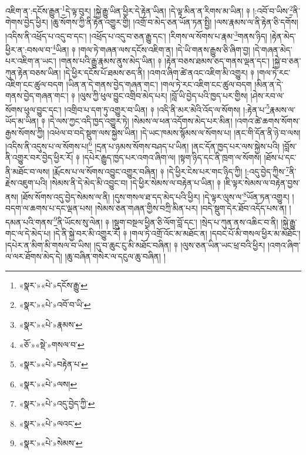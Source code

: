 འཇིག་ན་:དངོས་རྒྱུན་\footnote{«སྣར་»«པེ་»དངོས་རྒྱུ་}དེ་ལྟ་བུར། །སྐྱེ་རྒྱུ་ཡིན་ཕྱིར་དེ་རྟེན་ཡིན། །དེ་ལྟ་མིན་ན་རིགས་མ་ཡིན། ༈ །:འབོ་བ་ཡིས་\footnote{«སྣར་»«པེ་»འབོ་བ་ཡི་}ནི་གེགས་བྱེད་ཕྱིར། །ཆུ་སོགས་ཀྱི་ནི་རྟེན་འགྱུར་གྱི། །འགྲོ་བ་མེད་ཅན་ཡོན་ཏན་སྤྱི། །ལས་རྣམས་ལ་ནི་རྟེན་ཅི་དགོས། །འདིས་ནི་འཕྲོད་པ་འདུ་བ་དང་། །འཕྲོད་པ་འདུ་བ་ཅན་རྒྱུ་དང་། །རིགས་ལ་སོགས་པ་རྣམ་\footnote{«སྣར་»«པེ་»རྣམས་}གནས་ཉིད། །རྟེན་མེད་ཕྱིར་ན་:བསལ་བ་\footnote{«ཅོ་»«སྡེ་»གསལ་བ་}ཡིན། ༈ །གལ་ཏེ་གཞན་ལས་དངོས་འཇིག་ན། །དེ་ཡི་གནས་རྒྱུས་ཅི་ཞིག་བྱ། །དེ་གཞན་མེད་པར་འཇིག་ན་ཡང་། །གནས་པའི་རྒྱུ་རྣམས་ནུས་མེད་ཡིན། ༈ །རྟེན་བཅས་ཐམས་ཅད་གནས་ལྡན་དང་། །སྐྱེ་བ་ཅན་ཀུན་རྟེན་བཅས་ཡིན། །དེ་ཕྱིར་དངོས་པོ་ཐམས་ཅད་ནི། །འགའ་ཞིག་ཚེ་ནའང་འཇིག་མི་འགྱུར། ༈ །གལ་ཏེ་རང་འཇིག་ངང་ཚུལ་བདག །ཡིན་ན་དེ་གནས་བྱེད་གཞན་གང་། །གལ་ཏེ་རང་འཇིག་ངང་ཚུལ་བདག །མིན་ན་དེ་གནས་བྱེད་གཞན་གང་། ༈ །ལུས་ཀྱི་ཕུལ་བྱུང་འགྲིབ་མེད་པར། །བློ་ཡི་བྱེད་པའི་ཁྱད་པར་གྱིས། །ཤེས་རབ་ལ་སོགས་ཕུལ་བྱུང་དང་། །འགྲིབ་པ་དག་ཏུ་འགྱུར་བ་ཡིན། ༈ །འདི་ནི་མར་མེའི་འོད་ལ་སོགས། །:རྟེན་པ་\footnote{«སྣར་»«པེ་»བརྟེན་པ་}རྣམས་ལ་ཡོད་མ་ཡིན། ༈ །དེ་ལས་ཀྱང་འདི་ཁྱད་འགྱུར་ཏེ། །སེམས་ལ་ཕན་འདོགས་མེད་པར་མིན། །འགའ་ཚེ་ཆགས་སོགས་རྒྱས་སོགས་ཀྱི། །འཕེལ་བ་བདེ་སྡུག་ལས་སྐྱེས་ཡིན། །དེ་ཡང་ཁམས་སྙོམས་ལ་སོགས་པ། །ནང་གི་དོན་ནི་ཉེ་བ་ལས། །འདིས་ནི་འདུས་པ་ལ་སོགས་པ།\footnote{«སྣར་»«པེ་»ལས།} །དྲན་པ་ཉམས་སོགས་བཤད་པ་ཡིན། །ནང་དོན་ཁྱད་པར་ལས་སྐྱེས་པའི། །བློས་ནི་འགྱུར་བར་བྱེད་ཕྱིར་རོ། ༈ །དཔེར་རྒྱུད་ཁྱད་པར་འགའ་ཞིག་ལ། །སྟག་ཉིད་དང་ནི་ཁྲག་ལ་སོགས། །ཐོས་པ་དང་ནི་མཐོང་བ་ལས། །རྨོངས་པ་ལ་སོགས་འབྱུང་འགྱུར་བཞིན། ༈ །དེ་ཕྱིར་ངེས་པར་གང་ཉིད་ཀྱི། །:འདུ་བྱེད་ཀྱིས་\footnote{«སྣར་»«པེ་»འདུ་བྱེད་ཀྱི་}ནི་རྗེས་འཇུག་པའི། །སེམས་ནི་དེ་མེད་མི་འབྱུང་བ། །དེ་ཕྱིར་སེམས་ལ་བརྟེན་པ་ཡིན། ༈ །ཇི་ལྟར་སེམས་ལ་བརྟེན་བྱས་ནས། །ཐོས་སོགས་འདུ་བྱེད་སེམས་ལ་ནི། །དུས་གསལ་ཐ་དད་མེད་པའི་ཕྱིར། །དེ་ལྟར་ལུས་ལ་\footnote{«སྣར་»«པེ་»ལའང་}ཡོན་ཏན་འགྱུར། །བདག་ལ་ཆགས་པ་དང་ལྡན་པས། །སེམས་ཅན་གཞན་གྱིས་བཀྲི་མིན་པར། །བདེ་སྡུག་དེར་ཐོབ་འདོད་པས་ན། །དམན་པའི་གནས་\footnote{«སྣར་»«པེ་»སེམས་}ནི་ཡོངས་སུ་ལེན། ༈ །སྡུག་བསྔལ་ཕྱིན་ཅི་ལོག་བློ་དང་། །སྲེད་པ་ཀུན་ནས་འཆིང་བ་ནི། །སྐྱེ་རྒྱུ་གང་ལ་དེ་མེད་པ། །དེ་ནི་སྐྱེ་བར་མི་འགྱུར་རོ། ༈ །གལ་ཏེ་འགྲོ་འོང་མ་མཐོང་ན། །དབང་པོ་མི་གསལ་ཕྱིར་མ་མཐོང་། །དཔེར་ན་མིག་མི་གསལ་བ་ཡིས། །དུ་བ་ཆུང་ངུ་མི་མཐོང་བཞིན། ༈ །ལུས་ཅན་ཡིན་ཡང་ཕྲ་བའི་ཕྱིར། །འགའ་ཞིག་ལ་ལར་ཐོགས་མེད་དེ། །ཆུ་བཞིན་གསེར་ལ་དངུལ་ཆུ་བཞིན། །
